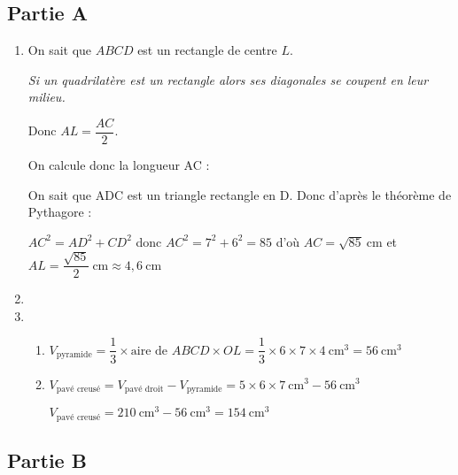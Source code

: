 \subsection*{Partie A}
\begin{enumerate}
\item On sait que $ABCD$ est un rectangle de centre $L$.

\textit{Si un quadrilatère est un rectangle alors ses diagonales se coupent en leur milieu.}

Donc $AL =\dfrac{AC}{2}$. 

On calcule donc la longueur AC :

On sait que ADC est un triangle rectangle en D. Donc d’après le théorème de Pythagore :

$AC^2 = AD^2 + CD^2$ donc $AC^2 = 7^2+ 6^2= 85$ d'où $AC = \sqrt{85}~\text{cm}$ et $AL = \dfrac{\sqrt{85}}{2}~\text{cm} \approx 4,6~\text{cm}$

\item 
{}

\item
\begin{enumerate}
	\item $V_{\text{pyramide}} = \dfrac{1}{3}\times \text{aire de $ABCD$} \times OL = \dfrac{1}{3}\times 6 \times 7 \times 4~\text{cm}^3=56~\text{cm}^3$
	\item $V_{\text{pavé creusé}} = V_{\text{pavé droit}} - V_{\text{pyramide}} = 5\times 6\times 7~\text{cm}^3 - 56~\text{cm}^3$
	
	$V_{\text{pavé creusé}} =  210~\text{cm}^3 - 56~\text{cm}^3=154~\text{cm}^3$
\end{enumerate}
\end{enumerate}

\subsection*{Partie B}

